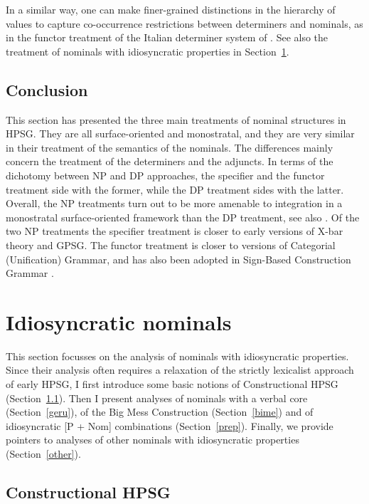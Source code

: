 \documentclass[output=paper
	        ,collection
	        ,collectionchapter
 	        ,biblatex
                ,babelshorthands
                ,newtxmath
                ,draftmode
                ,colorlinks, citecolor=brown
]{langscibook}
\begin{document}
In a similar way, one can make finer-grained distinctions in the hierarchy of  
 values to capture co-occurrence restrictions between determiners and 
nominals, as in the functor treatment of the Italian determiner system of 
\citet{Allegranza06}. See also the treatment of nominals with idiosyncratic properties 
in Section~\ref{idio}. 


\subsection{Conclusion} 


This section has presented the three main treatments of nominal structures in HPSG. 
They are all surface-oriented and monostratal, and they are very similar in their 
treatment of the semantics of the nominals. 
The differences mainly concern the treatment of the determiners and the adjuncts. 
In terms of the dichotomy between NP and DP approaches, the specifier and the functor 
treatment side with the former, while the DP treatment sides with the latter. 
Overall, the NP treatments turn out to be more amenable to integration  
in a monostratal surface-oriented framework than the DP treatment, see also \citet{MuellerHeadless}. 
Of the two NP treatments
the specifier treatment is closer to early versions of X-bar theory and GPSG.   
The functor treatment is closer to versions of Categorial (Unification) Grammar, and 
has also been adopted in Sign-Based Construction Grammar \citep[155--157]{Sag2012}.

 

\section{Idiosyncratic nominals}
\label{idio}


This section focusses on the analysis of nominals with idiosyncratic properties. 
Since their analysis often requires a relaxation of the strictly lexicalist approach 
of early HPSG, I first introduce some basic notions of Constructional HPSG (Section~\ref{cohp}). 
Then I present analyses of nominals with a verbal core (Section~\ref{geru}), 
of the Big Mess Construction (Section~\ref{bime}) and of idiosyncratic [P + Nom] combinations 
(Section~\ref{prep}). Finally, we provide pointers to analyses of other nominals with 
idiosyncratic properties (Section~\ref{other}). 


\subsection{Constructional HPSG} 
\label{cohp}
\end{document}
